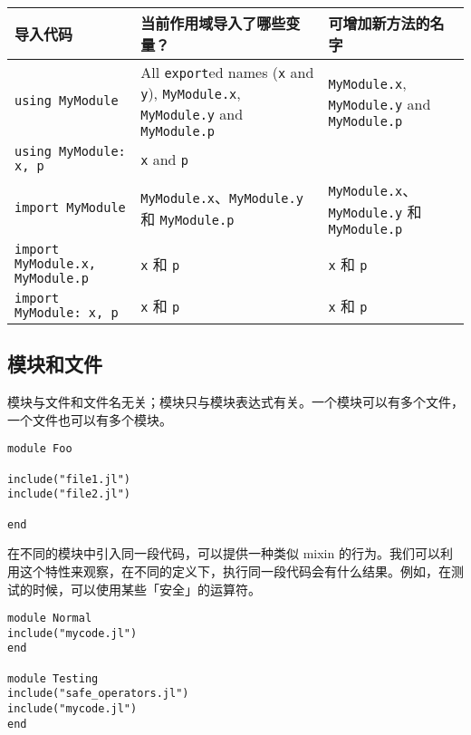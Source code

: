 \begin{table}[h]

\begin{tabulary}{\linewidth}{|L|L|L|}
\hline
导入代码 & 当前作用域导入了哪些变量？ & 可增加新方法的名字 \\
\hline
\texttt{using MyModule} & All \texttt{export}ed names (\texttt{x} and \texttt{y}), \texttt{MyModule.x}, \texttt{MyModule.y} and \texttt{MyModule.p} & \texttt{MyModule.x}, \texttt{MyModule.y} and \texttt{MyModule.p} \\
\hline
\texttt{using MyModule: x, p} & \texttt{x} and \texttt{p} &  \\
\hline
\texttt{import MyModule} & \texttt{MyModule.x}、\texttt{MyModule.y} 和 \texttt{MyModule.p} & \texttt{MyModule.x}、\texttt{MyModule.y} 和 \texttt{MyModule.p} \\
\hline
\texttt{import MyModule.x, MyModule.p} & \texttt{x} 和 \texttt{p} & \texttt{x} 和 \texttt{p} \\
\hline
\texttt{import MyModule: x, p} & \texttt{x} 和 \texttt{p} & \texttt{x} 和 \texttt{p} \\
\hline
\end{tabulary}

\end{table}



\hypertarget{14341239136076041524}{}


\subsection{模块和文件}



模块与文件和文件名无关；模块只与模块表达式有关。一个模块可以有多个文件，一个文件也可以有多个模块。




\begin{verbatim}
module Foo

include("file1.jl")
include("file2.jl")

end
\end{verbatim}



在不同的模块中引入同一段代码，可以提供一种类似 mixin 的行为。我们可以利用这个特性来观察，在不同的定义下，执行同一段代码会有什么结果。例如，在测试的时候，可以使用某些「安全」的运算符。




\begin{verbatim}
module Normal
include("mycode.jl")
end

module Testing
include("safe_operators.jl")
include("mycode.jl")
end
\end{verbatim}



